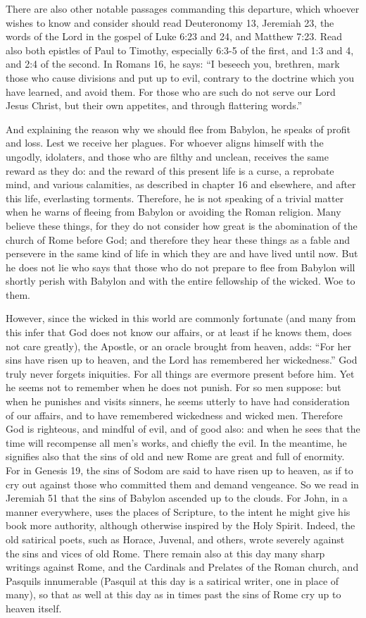 There are also other notable passages commanding this departure, which whoever wishes to know and consider should read Deuteronomy 13, Jeremiah 23, the words of the Lord in the gospel of Luke 6:23 and 24, and Matthew 7:23. Read also both epistles of Paul to Timothy, especially 6:3-5 of the first, and 1:3 and 4, and 2:4 of the second. In Romans 16, he says: “I beseech you, brethren, mark those who cause divisions and put up to evil, contrary to the doctrine which you have learned, and avoid them. For those who are such do not serve our Lord Jesus Christ, but their own appetites, and through flattering words.”

And explaining the reason why we should flee from Babylon, he speaks of profit and loss. Lest we receive her plagues. For whoever aligns himself with the ungodly, idolaters, and those who are filthy and unclean, receives the same reward as they do: and the reward of this present life is a curse, a reprobate mind, and various calamities, as described in chapter 16 and elsewhere, and after this life, everlasting torments. Therefore, he is not speaking of a trivial matter when he warns of fleeing from Babylon or avoiding the Roman religion. Many believe these things, for they do not consider how great is the abomination of the church of Rome before God; and therefore they hear these things as a fable and persevere in the same kind of life in which they are and have lived until now. But he does not lie who says that those who do not prepare to flee from Babylon will shortly perish with Babylon and with the entire fellowship of the wicked. Woe to them.

However, since the wicked in this world are commonly fortunate (and many from this infer that God does not know our affairs, or at least if he knows them, does not care greatly), the Apostle, or an oracle brought from heaven, adds: “For her sins have risen up to heaven, and the Lord has remembered her wickedness.” God truly never forgets iniquities. For all things are evermore present before him. Yet he seems not to remember when he does not punish. For so men suppose: but when he punishes and visits sinners, he seems utterly to have had consideration of our affairs, and to have remembered wickedness and wicked men. Therefore God is righteous, and mindful of evil, and of good also: and when he sees that the time will recompense all men's works, and chiefly the evil. In the meantime, he signifies also that the sins of old and new Rome are great and full of enormity. For in Genesis 19, the sins of Sodom are said to have risen up to heaven, as if to cry out against those who committed them and demand vengeance. So we read in Jeremiah 51 that the sins of Babylon ascended up to the clouds. For John, in a manner everywhere, uses the places of Scripture, to the intent he might give his book more authority, although otherwise inspired by the Holy Spirit. Indeed, the old satirical poets, such as Horace, Juvenal, and others, wrote severely against the sins and vices of old Rome. There remain also at this day many sharp writings against Rome, and the Cardinals and Prelates of the Roman church, and Pasquils innumerable (Pasquil at this day is a satirical writer, one in place of many), so that as well at this day as in times past the sins of Rome cry up to heaven itself.

